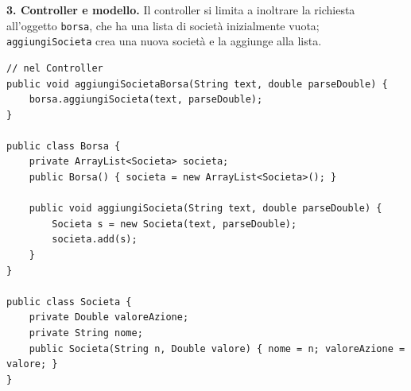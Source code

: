 \textbf{3. Controller e modello.} Il controller si limita a inoltrare la richiesta all'oggetto \texttt{borsa}, che ha una lista di
società inizialmente vuota; \texttt{aggiungiSocieta} crea una nuova società e la aggiunge alla lista.
\begin{lstlisting}[style=java]
// nel Controller
public void aggiungiSocietaBorsa(String text, double parseDouble) {
    borsa.aggiungiSocieta(text, parseDouble);
}

public class Borsa {
    private ArrayList<Societa> societa;
    public Borsa() { societa = new ArrayList<Societa>(); }

    public void aggiungiSocieta(String text, double parseDouble) {
        Societa s = new Societa(text, parseDouble);
        societa.add(s);
    }
}

public class Societa {
    private Double valoreAzione;
    private String nome;
    public Societa(String n, Double valore) { nome = n; valoreAzione = valore; }
}
\end{lstlisting}

